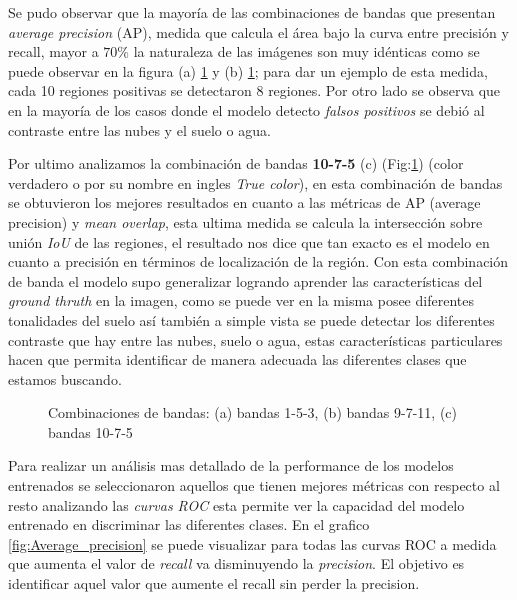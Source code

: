 Se pudo observar que la mayoría de las combinaciones de bandas que presentan \textit{average precision} (AP), medida que calcula  el área bajo la curva entre precisión y recall, mayor a $70\%$ la naturaleza de las imágenes son muy idénticas como se puede observar en la figura (a) \ref{fig:COMB_BANDAS} y (b) \ref{fig:COMB_BANDAS}; para dar un ejemplo de esta medida, cada 10 regiones positivas se detectaron $8$ regiones. Por otro lado se observa que en la mayoría de los casos donde el modelo detecto \textit{falsos positivos} se debió al contraste entre las nubes y el suelo o agua.



Por ultimo analizamos la combinación de bandas \textbf{10-7-5} (c) (Fig:\ref{fig:COMB_BANDAS}) (color verdadero o por su nombre en ingles \textit{True color}), en esta combinación de bandas se obtuvieron los mejores resultados en cuanto a las métricas de AP (average precision) y  \textit{mean overlap}, esta ultima medida se calcula la intersección sobre unión \textit{IoU} de las regiones, el resultado nos dice que tan exacto es el modelo en cuanto a precisión en términos de localización de la región. Con esta combinación de banda el modelo supo generalizar logrando aprender las características del \textit{ground thruth} en la imagen, como se puede ver en la misma posee diferentes tonalidades del suelo así también a simple vista se puede detectar los diferentes contraste que hay entre las nubes, suelo o agua, estas características particulares hacen que permita identificar de manera adecuada las diferentes clases que estamos buscando.

\begin{figure}[htbp]
\centering
{}
\caption{Combinaciones de bandas: (a) bandas 1-5-3, (b) bandas 9-7-11, (c) bandas 10-7-5} \label{fig:COMB_BANDAS}
\end{figure}

Para realizar un análisis mas detallado de la performance de los modelos entrenados se seleccionaron aquellos que tienen mejores métricas con respecto al resto analizando las \textit{curvas ROC} esta permite ver la capacidad del modelo entrenado en discriminar las diferentes clases. En el grafico \ref{fig:Average_precision} se puede visualizar para todas las curvas ROC a medida que aumenta el valor de \textit{recall} va disminuyendo la \textit{precision}. El objetivo es identificar aquel valor que aumente el recall sin perder la precision.
\newpage

